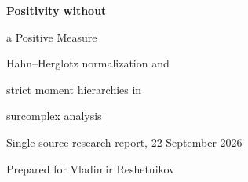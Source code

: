 \documentclass[11pt,letterpaper]{article}
\theoremstyle{definition}
\numberwithin{equation}{section}
\begin{document}
\hypersetup{pageanchor=false}
\begin{titlepage}
\setlength{\parindent}{0pt}
\vspace*{-.4cm}
\noindent{\color{accent}\rule{\textwidth}{1.4pt}}\par
\vspace{.3cm}
{\Huge\bfseries\color{ink} Positivity without\par a Positive Measure\par}
\vspace{.3cm}
{\LARGE Hahn--Herglotz normalization and\par strict moment hierarchies in\par surcomplex analysis\par}
\vspace{.3cm}
{\large Single-source research report, 22 September 2026\par}
{\normalsize Prepared for Vladimir Reshetnikov\par}
\vspace{.2cm}
\begin{abstract}
\noindent
Over a real or complex Hahn field, three classical manifestations of positivity cease to be equivalent: positivity of every finite Toeplitz matrix, positivity of a holomorphic real part, and representation by a positive measure on the ordinary circle. We establish a constant-congruence normalization theorem for matrix-valued coherent Hahn-holomorphic functions over arbitrary-rank divisible value groups; divisibility is used there and nowhere else. The normalized function has a strictly positive ordinary leading part and otherwise unrestricted infinitesimal holomorphic coefficients. A Harnack comparison survives over every ordered value group with any strictly enlarged classical constant, but the sharp classical constant need not survive.


\end{abstract}
\end{titlepage}
\end{document}
